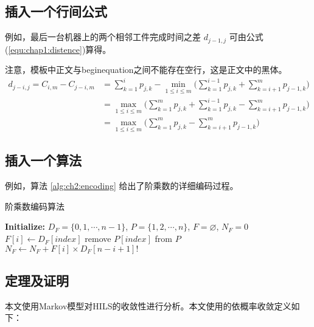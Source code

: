 \subsection{插入一个行间公式}

例如，最后一台机器上的两个相邻工件完成时间之差 $d_{j-1,j}$ 可由公式(\ref{equ:chap1:distence})算得。

注意，模板中正文与begin{equation}之间不能存在空行，{\heiti 这是正文中的黑体}。
\begin{equation}
	\label{equ:chap1:distence}
	\begin{aligned}
	d_{j-i,j}=C_{i,m}-C_{j-i,m}&=\sum_{k=1}^{i}{p_{j,k}}-\min\limits_{1 \leq i \leq m}\big(\sum_{k=1}^{i-1}{p_{j,k}}+\sum_{k=i+1}^{m}{p_{j-1,k}}\big)\\
	&=\max\limits_{1 \leq i \leq m}\big(\sum_{k=1}^{m}{p_{j,k}}+\sum_{k=1}^{i-1}{p_{j,k}}-\sum_{k=i+1}^{m}{p_{j-1,k}}\big)\\
	&=\max\limits_{1 \leq i \leq m}\big(\sum_{k=1}^{m}{p_{j,k}}-\sum_{k=i+1}^{m}{p_{j-1,k}}\big)
	\end{aligned}
\end{equation}

\subsection{插入一个算法}

例如，算法 \ref{alg:ch2:encoding} 给出了阶乘数的详细编码过程。

\begin{myAlgorithm}
    \caption{阶乘数编码算法} %
    \label{alg:ch2:encoding}
    \textbf{Initialize: }$ D_F=\{0,1,\cdots,n-1\} $, $ P=\{1,2,\cdots,n\} $, $ F=\varnothing $, $  N_F=0 $\;
    {
		 $F[i] \gets D_F [index]$\;
		 remove $ P[index] $ from $ P $\;
		 $ N_F \gets N_F+F[i] \times D_F [n-i+1]! $\;
    }
\end{myAlgorithm}

\subsection{定理及证明}

本文使用Markov模型对HILS的收敛性进行分析。本文使用的依概率收敛定义如下：

